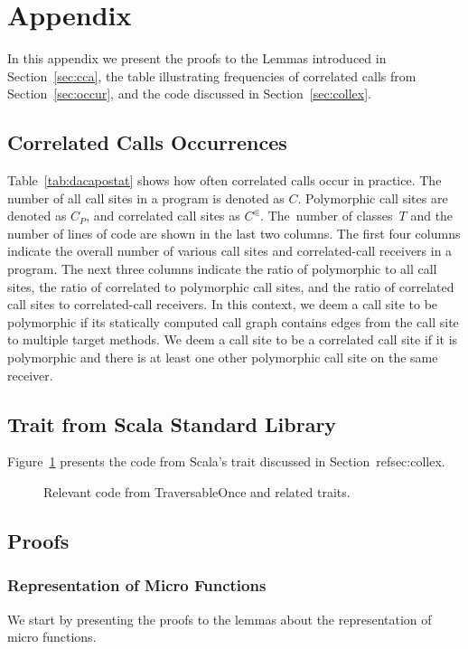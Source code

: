 \section*{Appendix}
In this appendix we present the proofs to the Lemmas introduced in Section~\ref{sec:cca}, the table illustrating frequencies of correlated calls from Section~\ref{sec:occur}, and the code discussed in Section~\ref{sec:collex}.

\subsection*{Correlated Calls Occurrences}
Table~\ref{tab:dacapostat} shows how often correlated calls occur in practice. The number of all call sites in a program is denoted as $C$. 
Polymorphic call sites are denoted as $C_P$, and correlated call sites as $C^\Subset$. The~number of classes~$T$ and the number of lines of code are shown in the last two columns.
The first four columns indicate the overall number of various call sites and correlated-call receivers in a program. 
The next three columns indicate the ratio of polymorphic to all call sites, the ratio of correlated to polymorphic call sites, and the ratio of correlated call sites to correlated-call receivers.
In this context, we deem a call site to be polymorphic if its statically computed call graph
contains edges from the call site to multiple target methods.
We deem a call site to be a correlated call site if it is polymorphic and there is
at least one other polymorphic call site on the same receiver.


\subsection*{ Trait from Scala Standard Library}
Figure~\ref{fig:traversableonce} presents the code from Scala's  trait discussed in Section~ref{sec:collex}.

\begin{figure}
\caption{Relevant code from \textsf{TraversableOnce} and related traits.}
\label{fig:traversableonce}
\end{figure}

\subsection*{Proofs}

\subsubsection*{Representation of Micro Functions}
We start by presenting the proofs to the lemmas about the representation of micro functions.

